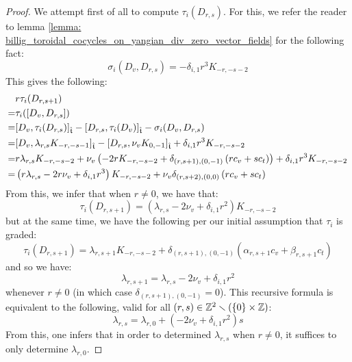 \begin{proof}
                We attempt first of all to compute $\tau_i(D_{r, s})$. For this, we refer the reader to lemma \ref{lemma: billig_toroidal_cocycles_on_yangian_div_zero_vector_fields} for the following fact:
                    $$\sigma_i(D_v, D_{r, s}) = -\delta_{i, 1} r^3 K_{-r, -s - 2}$$
                This gives the following:
                    \begin{equation} \label{equation: tau_i_on_commutator_of_D_v_and_D_rs}
                        \begin{aligned}
                            & r \tau_i(D_{r, s + 1})
                            \\
                            = & \tau_i([D_v, D_{r, s}])
                            \\
                            = & [D_v, \tau_i(D_{r, s})]_{\hat{\mathfrak{t}}} - [D_{r, s}, \tau_i(D_v)]_{\hat{\mathfrak{t}}} - \sigma_i(D_v, D_{r, s})
                            \\
                            = & [D_v, \lambda_{r, s} K_{-r, -s - 1}]_{\hat{\mathfrak{t}}} - [D_{r, s}, \nu_v K_{0, -1}]_{\hat{\mathfrak{t}}} + \delta_{i, 1} r^3 K_{-r, -s - 2}
                            \\
                            = & r \lambda_{r, s} K_{-r, -s - 2} + \nu_v \left( -2r K_{-r, -s - 2} + \delta_{(r, s + 1), (0, -1)} \left( r c_v + s c_t \right) \right) + \delta_{i, 1} r^3 K_{-r, -s - 2}
                            \\
                            = & \left( r \lambda_{r, s} - 2r \nu_v + \delta_{i, 1} r^3 \right) K_{-r, -s - 2} + \nu_v \delta_{(r, s + 2), (0, 0)} \left( r c_v + s c_t \right)
                        \end{aligned}
                    \end{equation}
                From this, we infer that when $r \not = 0$, we have that:
                    $$\tau_i(D_{r, s + 1}) = \left( \lambda_{r, s} - 2\nu_v + \delta_{i, 1} r^2 \right) K_{-r, -s - 2}$$
                but at the same time, we have the following per our initial assumption that $\tau_i$ is graded:
                    $$\tau_i(D_{r, s + 1}) = \lambda_{r, s + 1} K_{-r, -s - 2} + \delta_{(r, s + 1), (0, -1)} ( \alpha_{r, s + 1} c_v + \beta_{r, s + 1} c_t )$$
                and so we have:
                    $$\lambda_{r, s + 1} = \lambda_{r, s} - 2\nu_v + \delta_{i, 1} r^2$$
                whenever $r \not = 0$ (in which case $\delta_{(r, s + 1), (0, -1)} = 0$). This recursive formula is equivalent to the following, valid for all $(r, s) \in \Z^2 \setminus ( \{0\} \x \Z )$:
                    \begin{equation} \label{equation: lambda_rs_coefficients_recursion}
                        \lambda_{r, s} = \lambda_{r, 0} + (-2\nu_v + \delta_{i, 1} r^2) s
                    \end{equation}
                From this, one infers that in order to determined $\lambda_{r, s}$ when $r \not = 0$, it suffices to only determine $\lambda_{r, 0}$.
                

\end{proof}
